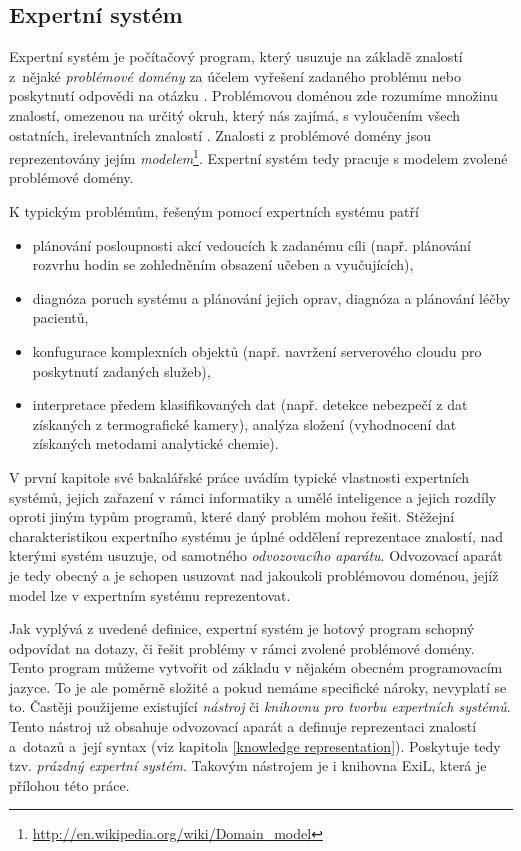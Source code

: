 \subsection{Expertní systém}

Expertní systém je počítačový program, který usuzuje na základě znalostí
z~nějaké \emph{problémové domény} za účelem vyřešení zadaného problému nebo
poskytnutí odpovědi na otázku \cite{introduction}. Problémovou doménou zde
rozumíme množinu znalostí, omezenou na určitý okruh, který nás zajímá, s
vyloučením všech ostatních, irelevantních znalostí \cite{problem-domain}.
Znalosti z problémové domény jsou reprezentovány jejím
\emph{modelem}\footnote{\url{http://en.wikipedia.org/wiki/Domain\_model}}.
Expertní systém tedy pracuje s modelem zvolené problémové domény.

K typickým problémům, řešeným pomocí expertních systému patří
\cite{introduction}
\begin{itemize}
  \item plánování posloupnosti akcí vedoucích k zadanému cíli (např.
    plánování rozvrhu hodin se zohledněním obsazení učeben a vyučujících),
  \item diagnóza poruch systému a plánování jejich oprav, diagnóza a plánování
    léčby pacientů,
  \item konfugurace komplexních objektů (např. navržení serverového cloudu pro
    poskytnutí zadaných služeb),
  \item interpretace předem klasifikovaných dat (např. detekce nebezpečí z dat
    získaných z termografické kamery), analýza složení (vyhodnocení dat
    získaných metodami analytické chemie).
\end{itemize}

V první kapitole své bakalářské práce \cite{bakalarka} uvádím typické vlastnosti
expertních systémů, jejich zařazení v rámci informatiky a umělé inteligence a
jejich rozdíly oproti jiným typům programů, které daný problém mohou řešit.
Stěžejní charakteristikou expertního systému je úplné oddělení reprezentace
znalostí, nad kterými systém usuzuje, od samotného \emph{odvozovacího aparátu}.
Odvozovací aparát je tedy obecný a je schopen usuzovat nad jakoukoli problémovou
doménou, jejíž model lze v expertním systému reprezentovat.

Jak vyplývá z uvedené definice, expertní systém je hotový program schopný
odpovídat na dotazy, či řešit problémy v rámci zvolené problémové domény. Tento
program můžeme vytvořit od základu v nějakém obecném programovacím jazyce. To je
ale poměrně složité a pokud nemáme specifické nároky, nevyplatí se to. Častěji
použijeme existující \emph{nástroj} či \emph{knihovnu pro tvorbu expertních
systémů}. Tento nástroj už obsahuje odvozovací aparát a definuje reprezentaci
znalostí a~dotazů a~její syntax (viz kapitola \ref{knowledge representation}).
Poskytuje tedy tzv. \emph{prázdný expertní systém}. Takovým nástrojem je i
knihovna ExiL, která je přílohou této práce.

